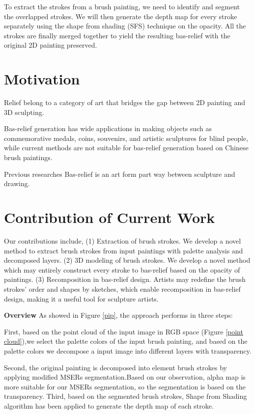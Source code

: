 To extract the strokes from a brush painting, we need to identify and segment the overlapped strokes. We will then generate the depth map for every stroke separately using the shape from shading (SFS) technique on the opacity. All the strokes are finally merged together to yield the resulting bas-relief with the original 2D painting preserved. 

\section{Motivation}

Relief belong to a category of art that bridges the gap between 2D painting and 3D sculpting\cite{kerber2012computer}.

Bas-relief generation has wide applications in making objects such as commemorative medals, coins, souvenirs, and artistic sculptures for blind people, while current methods are not suitable for bas-relief generation based on Chinese brush paintings. 


Previous researches 
Bas-relief is an art form part way between sculpture and drawing. \cite{zeng2014region} 


\section{Contribution of Current Work}
Our contributions include,
\newline
(1) Extraction of brush strokes. We develop a novel method to extract brush strokes from input paintings with palette analysis and decomposed layers.
\newline
(2) 3D modeling of brush strokes. We develop a novel method which may entirely construct every stroke to bas-relief based on the opacity of paintings.
\newline
(3) Recomposition in bas-relief design. Artists may redefine the brush strokes’ order and shapes by sketches, which enable recomposition in bas-relief design, making it a useful tool for sculpture artists.

\textbf{Overview}  As showed in Figure \ref{pip}, the approach performs in three steps:

First, based on the point cloud of the input image in RGB space (Figure \ref{point cloud}),we select the palette colors of the input brush painting, and based on the palette colors we decompose a input image into different layers with transparency.  

Second,  the original painting is decomposed into element brush strokes by applying modified MSERs segmentation.Based on our observation, alpha map is more suitable for our MSERs segmentation, so the segmentation is based on the transparency. Third, based on the segmented brush strokes,  Shape from Shading algorithm has been applied to generate the depth map of each stroke.  

